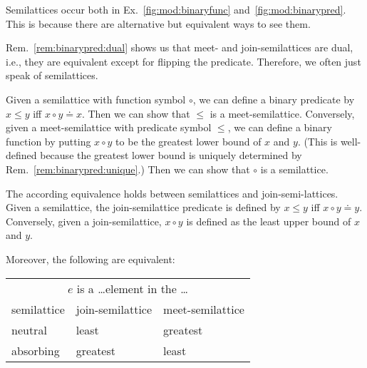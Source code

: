 \begin{remark}[Semilattices]\label{rem:semilattice}
Semilattices occur both in Ex.~\ref{fig:mod:binaryfunc} and~\ref{fig:mod:binarypred}.
This is because there are alternative but equivalent ways to see them.

Rem.~\ref{rem:binarypred:dual} shows us that meet- and join-semilattices are dual, i.e., they are equivalent except for flipping the predicate.
Therefore, we often just speak of semilattices.

Given a semilattice with function symbol $\circ$, we can define a binary predicate by $x\leq y$ iff $x\circ y\doteq x$.
Then we can show that $\leq$ is a meet-semilattice.
Conversely, given a meet-semilattice with predicate symbol $\leq$, we can define a binary function by putting $x\circ y$ to be the greatest lower bound of $x$ and $y$.
(This is well-defined because the greatest lower bound is uniquely determined by Rem.~\ref{rem:binarypred:unique}.)
Then we can show that $\circ$ is a semilattice.

The according equivalence holds between semilattices and join-semi-lattices.
Given a semilattice, the join-semilattice predicate is defined by $x\leq y$ iff $x\circ y\doteq y$.
Conversely, given a join-semilattice, $x\circ y$ is defined as the least upper bound of $x$ and $y$.

Moreover, the following are equivalent:
\begin{center}
\begin{tabular}{|l|l|l|}
\hline
\multicolumn{3}{|c|}{$e$ is a \ldots element in the \ldots} \\
semilattice & join-semilattice & meet-semilattice \\
\hline
neutral & least & greatest \\
absorbing & greatest & least \\
\hline
\end{tabular}
\end{center}
\end{remark}


